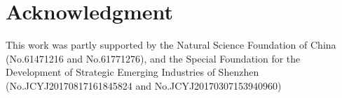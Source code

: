 \documentclass[journal]{IEEEtran}
\begin{document}
\section*{Acknowledgment}
This work was partly supported by the Natural Science Foundation of China (No.61471216 and No.61771276),  and the Special Foundation for the Development of Strategic Emerging Industries of Shenzhen (No.JCYJ20170817161845824 and No.JCYJ20170307153940960)
 \newpage
\ifCLASSOPTIONcaptionsoff
  \newpage
\fi
\enlargethispage{-10cm}

\ifCLASSOPTIONcaptionsoff
  \newpage
\fi
























\end{document}
